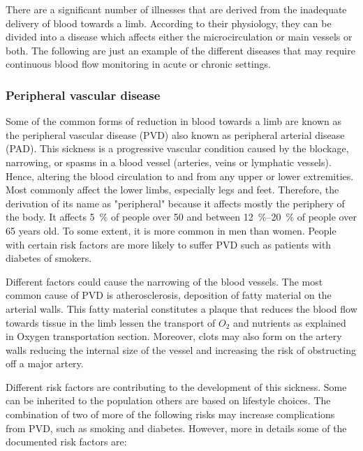 
There are a significant number of illnesses that are derived from the inadequate delivery of blood towards a limb. According to their physiology, they can be divided into a disease which affects either the microcirculation or main vessels or both. The following are just an example of the different diseases that may require continuous blood flow monitoring in acute or chronic settings.



\subsubsection{Peripheral vascular disease}
\label{section literature 2.1}
Some of the common forms of reduction in blood towards a limb are known as the peripheral vascular disease (PVD) also known as peripheral arterial disease (PAD). This sickness is a progressive vascular condition caused by the blockage, narrowing, or spasms in a blood vessel (arteries, veins or lymphatic vessels). Hence, altering the blood circulation to and from any upper or lower extremities.  Most commonly affect the lower limbs, especially legs and feet. Therefore, the derivation of its name as "peripheral" because it affects mostly the periphery of the body. It affects \SI{5}{\percent} of people over \num{50} and between \SIrange{12}{20}{\percent} of people over 65 years old. To some extent, it is more common in men than women. People with certain risk factors are more likely to suffer PVD such as patients with diabetes of smokers.  


Different factors could cause the narrowing of the blood vessels. The most common cause of PVD is atherosclerosis, deposition of fatty material on the arterial walls. This fatty material constitutes a plaque that reduces the blood flow towards tissue in the limb lessen the transport of $O_2$ and nutrients as explained in Oxygen transportation section. Moreover, clots may also form on the artery walls reducing the internal size of the vessel and increasing the risk of obstructing off a major artery. 

Different risk factors are contributing to the development of this sickness. Some can be inherited to the population others are based on lifestyle choices. The combination of two of more of the following risks may increase complications from PVD, such as smoking and diabetes. However, more in details some of the documented risk factors are:


